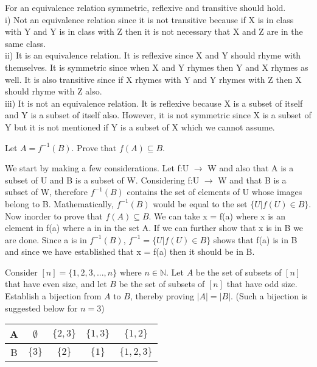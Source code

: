 \documentclass[addpoints]{exam}
\begin{document}
\begin{questions}
\begin{parts}
  \begin{solution}
   For an equivalence relation symmetric, reflexive and transitive should hold.\\  
   i) Not an equivalence relation since it is not transitive because if X is in class with Y and Y is in class with Z then it is not necessary that X and Z are in the same class. \\
   ii) It is an equivalence relation. It is reflexive since X and Y should rhyme with themselves. It is symmetric since when X and Y rhymes then Y and X rhymes as well. It is also transitive since if X rhymes with Y and Y rhymes with Z then X should rhyme with Z also.\\
   iii) It is not an equivalence relation. It is reflexive because X is a subset of itself and Y is a subset of itself also. However, it is not symmetric since X is a subset of Y but it is not mentioned if Y is a subset of X which we cannot assume.
  \end{solution}

\end{parts}

\question[15] Let $A = f^{-1}(B)$. Prove that $f(A) \subseteq B$.
  \begin{solution}
    We start by making a few considerations. Let f:U $\xrightarrow{}$ W and also that A is a subset of U and B is a subset of W. Considering f:U $\rightarrow{}$ W and that B is a subset of W, therefore $f^{-1}(B)$ contains the set of elements of U whose images belong to B. Mathematically, $f^{-1} (B)$ would be equal to the set $\{U | f(U) \in B\}$. Now inorder to prove that $f(A) \subseteq B$. We can take x = f(a) where x is an element in f(a) where a in in the set A. If we can further show that x is in B we are done. Since a is in $f^{-1}(B)$, $f^{-1} = \{U | f(U) \in B\}$ shows that f(a) is in B and since we have established that x = f(a) then it should be in B.
  \end{solution}

\question[15] Consider $[n] = \{1,2,3,...,n\}$ where $n \in \mathbb{N}$. Let $A$ be the set of subsets of $[n]$ that have even size, and let $B$ be the set of subsets of $[n]$ that have odd size. Establish a bijection from $A$ to $B$, thereby proving $|A| = |B|$. (Such a bijection is suggested below for $n = 3$) 

\begin{center}

  \begin{tabular}{ |c || c | c | c |c |}
    \hline
 A & $\emptyset$ & $\{2,3\}$ & $\{1,3\}$ & $\{1,2\}$ \\ \hline
 B & $\{3\}$ & $\{2\}$ & $\{1\}$ & $\{1,2,3\}$\\\hline
\end{tabular}
\end{center}


\end{questions}
\end{document}

